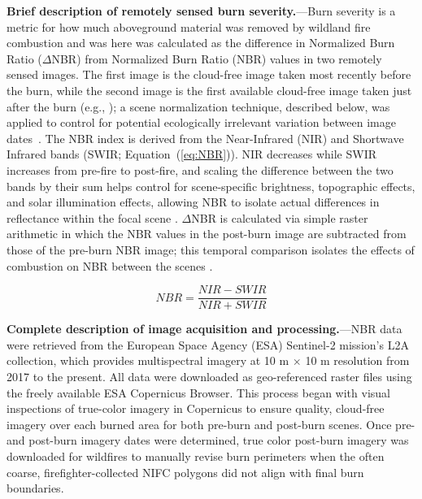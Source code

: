 \documentclass[fire,article,accept,oneauthor,pdftex]{Definitions/mdpi}
\begin{document}
\textbf{Brief description of remotely sensed burn severity.}---Burn severity is a metric for how much aboveground material was removed by wildland fire combustion and was here was calculated as the difference in Normalized Burn Ratio ($\Delta$NBR) from Normalized Burn Ratio (NBR) values in two remotely sensed images. 
The first image is the cloud-free image taken most recently before the burn, while the second image is the first available cloud-free image taken just after the burn (e.g., \cite{llorens2021}); a scene normalization technique, described below, was applied to control for potential ecologically irrelevant variation between image dates~\cite{key2006a}.
The NBR index is derived from the Near-Infrared (NIR) and Shortwave Infrared bands (SWIR; Equation~(\ref{eq:NBR})). 
NIR decreases while SWIR increases from pre-fire to post-fire, and scaling the difference between the two bands by their sum helps control for scene-specific brightness, topographic effects, and solar illumination effects, allowing NBR to isolate actual differences in reflectance within the focal scene \cite{key2006a}.  
$\Delta$NBR is calculated via simple raster arithmetic in which the NBR values in the post-burn image are subtracted from those of the pre-burn NBR image; this temporal comparison isolates the effects of combustion on NBR between the scenes \cite{key2006a}. %
\begin{linenomath}
	\begin{equation}
	NBR = \frac{NIR - SWIR}{NIR + SWIR}
	\label{eq:NBR}
	\end{equation}
\end{linenomath}

\textbf{Complete description of image acquisition and processing.}---NBR data were retrieved from the European Space Agency (ESA) Sentinel-2 mission's L2A collection, which provides multispectral imagery at 10 m $\times$ 10 m resolution from 2017 to the present. 
All data were downloaded as geo-referenced raster files using the freely available ESA Copernicus Browser. 
This process began with visual inspections of true-color imagery in Copernicus to ensure quality, cloud-free imagery over each burned area for both pre-burn and post-burn scenes. 
Once pre- and post-burn imagery dates were determined, true color post-burn imagery was downloaded for wildfires to manually revise burn perimeters when the often coarse, firefighter-collected NIFC polygons did not align with final burn boundaries. 
\end{document}
